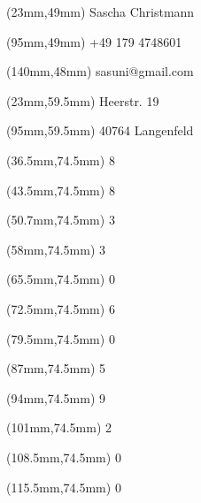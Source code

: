 \begin{textblock*}{60mm}(23mm,49mm)
	{\Large Sascha Christmann}
\end{textblock*}
\begin{textblock*}{50mm}(95mm,49mm)
	{\Large +49 179 4748601}
\end{textblock*}
\begin{textblock*}{40mm}(140mm,48mm)
	{\Large sasuni@gmail.com}
\end{textblock*}
\begin{textblock*}{60mm}(23mm,59.5mm)
	{\Large Heerstr. 19}
\end{textblock*}
\begin{textblock*}{80mm}(95mm,59.5mm)
	{\Large 40764 Langenfeld}
\end{textblock*}
\begin{textblock*}{74.5mm}(36.5mm,74.5mm)
	{\Large 8}
\end{textblock*}
\begin{textblock*}{74.5mm}(43.5mm,74.5mm)
	{\Large 8}
\end{textblock*}
\begin{textblock*}{74.5mm}(50.7mm,74.5mm)
	{\Large 3}
\end{textblock*}
\begin{textblock*}{74.5mm}(58mm,74.5mm)
	{\Large 3}
\end{textblock*}
\begin{textblock*}{74.5mm}(65.5mm,74.5mm)
	{\Large 0}
\end{textblock*}
\begin{textblock*}{74.5mm}(72.5mm,74.5mm)
	{\Large 6}
\end{textblock*}
\begin{textblock*}{74.5mm}(79.5mm,74.5mm)
	{\Large 0}
\end{textblock*}
\begin{textblock*}{74.5mm}(87mm,74.5mm)
	{\Large 5}
\end{textblock*}
\begin{textblock*}{74.5mm}(94mm,74.5mm)
	{\Large 9}
\end{textblock*}
\begin{textblock*}{74.5mm}(101mm,74.5mm)
	{\Large 2}
\end{textblock*}
\begin{textblock*}{74.5mm}(108.5mm,74.5mm)
	{\Large 0}
\end{textblock*}
\begin{textblock*}{74.5mm}(115.5mm,74.5mm)
	{\Large 0}
\end{textblock*}
